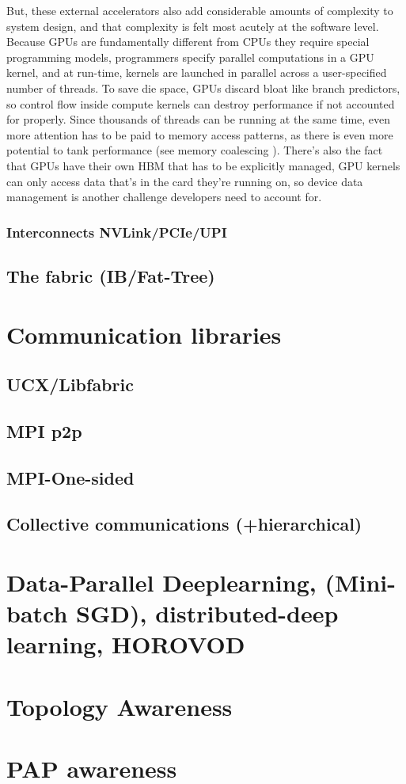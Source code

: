 But, these external accelerators also add considerable amounts of complexity to system design, and that complexity is felt most acutely at the software level.  
Because GPUs are fundamentally different from CPUs they require special programming models, programmers specify parallel computations in a GPU kernel, and at run-time, kernels are launched in parallel across a user-specified number of threads.
To save die space, GPUs discard bloat like branch predictors, so control flow inside compute kernels can destroy performance if not accounted for properly.
Since thousands of threads can be running at the same time, even more attention has to be paid to memory access patterns, as there is even more potential to tank performance (see memory coalescing \cite{CUDAMemCoalescing}).
There's also the fact that GPUs have their own HBM that has to be explicitly managed, GPU kernels can only access data that's in the card they're running on, so device data management is another challenge developers need to account for. 


\subsubsection{Interconnects NVLink/PCIe/UPI}

\subsection{The fabric (IB/Fat-Tree)}
    
\section{Communication libraries} 
\cite{mpi40, gabriel2004OpenMPI, MPICH, shamis2015ucx}
    \subsection{UCX/Libfabric}
    \subsection{MPI p2p}
    \subsection{MPI-One-sided}
    \subsection{Collective communications (+hierarchical)}
\section{Data-Parallel Deeplearning, (Mini-batch SGD), distributed-deep learning, HOROVOD}
\cite{Ben-Nun2019DemystifyDL, Sergeev2018Horovod}
\section{Topology Awareness}
\section{PAP awareness}
